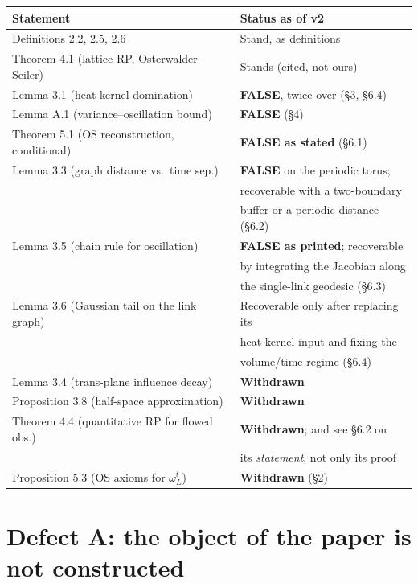 \documentclass[11pt]{article}
\begin{document}
\begin{center}
\begin{tabular}{|l|l|}
\hline
\textbf{Statement} & \textbf{Status as of v2}\\
\hline
Definitions 2.2, 2.5, 2.6 & Stand, as definitions\\
\hline
Theorem 4.1 (lattice RP, Osterwalder--Seiler) & Stands (cited, not ours)\\
\hline
Lemma 3.1 (heat-kernel domination) & \textbf{FALSE}, twice over (\S3, \S6.4)\\
\hline
Lemma A.1 (variance--oscillation bound) & \textbf{FALSE} (\S4)\\
\hline
Theorem 5.1 (OS reconstruction, conditional) & \textbf{FALSE as stated} (\S6.1)\\
\hline
Lemma 3.3 (graph distance vs.\ time sep.)
 & \textbf{FALSE} on the periodic torus;\\
 & recoverable with a two-boundary\\
 & buffer or a periodic distance (\S6.2)\\
\hline
Lemma 3.5 (chain rule for oscillation)
 & \textbf{FALSE as printed}; recoverable\\
 & by integrating the Jacobian along\\
 & the single-link geodesic (\S6.3)\\
\hline
Lemma 3.6 (Gaussian tail on the link graph)
 & Recoverable only after replacing its\\
 & heat-kernel input and fixing the\\
 & volume/time regime (\S6.4)\\
\hline
Lemma 3.4 (trans-plane influence decay) & \textbf{Withdrawn}\\
\hline
Proposition 3.8 (half-space approximation) & \textbf{Withdrawn}\\
\hline
Theorem 4.4 (quantitative RP for flowed obs.) & \textbf{Withdrawn}; and see \S6.2 on\\
 & its \emph{statement}, not only its proof\\
\hline
Proposition 5.3 (OS axioms for $\omega^t_L$) & \textbf{Withdrawn} (\S2)\\
\hline
\end{tabular}
\end{center}

\section{Defect A: the object of the paper is not constructed}
\end{document}
